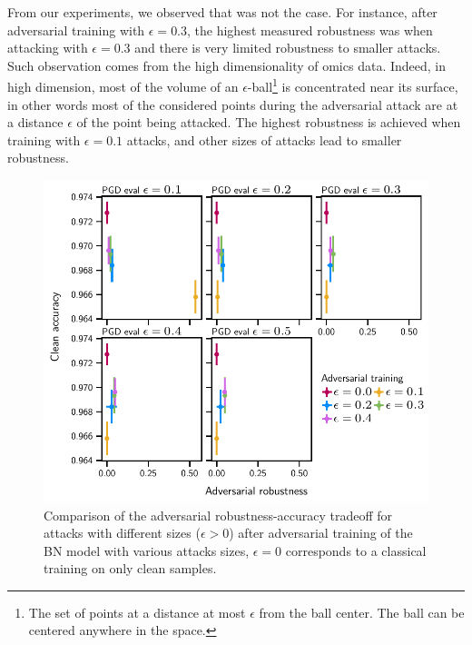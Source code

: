 \documentclass[../main.tex]{subfiles}
\begin{document}
		From our experiments, we observed that was not the case.
		For instance, after adversarial training with \(\epsilon = 0.3\), the highest measured robustness was when attacking with \(\epsilon=0.3\) and there is very limited robustness to smaller attacks.
		Such observation comes from the high dimensionality of omics data.
		Indeed, in high dimension, most of the volume of an \(\epsilon\)-ball\footnote{The set of points at a distance at most \(\epsilon\) from the ball center. The ball can be centered anywhere in the space.} is concentrated near its surface, in other words most of the considered points during the adversarial attack are at a distance \(\epsilon\) of the point being attacked.
		The highest robustness is achieved when training with \(\epsilon=0.1\) attacks, and other sizes of attacks lead to smaller robustness.

		\begin{figure}[htbp]
			\centering
			\includegraphics[scale=0.9]{MLP_BN_adversarial_tradeoff.pdf}
			\caption[ BN adversarial robustness-accuracy tradeoff]{Comparison of the adversarial robustness-accuracy tradeoff for  attacks with different sizes (\(\epsilon > 0\)) after adversarial training of the  BN model with various  attacks sizes, \(\epsilon = 0\) corresponds to a classical training on only clean samples.}\label{fig:mlp_bn_adv_tradeoff}
		\end{figure}
\end{document}
